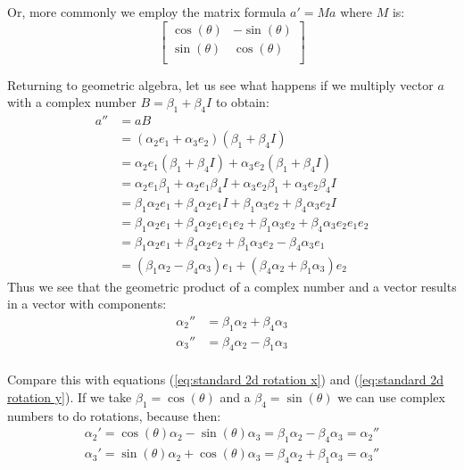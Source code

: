 \documentclass[10pt]{report}
\begin{document}
Or, more commonly we employ the matrix formula $a' = Ma$ where $M$
is:
\begin{equation*}
    \left[
    \begin{array}{rr}
    \cos(\theta)&-\sin(\theta)\\
    \sin(\theta)& \cos(\theta)\\
    \end{array}
    \right]
\end{equation*}

Returning to geometric algebra, let us see what happens if we
multiply vector $a$ with a complex number $B = \beta_1 + \beta_4I$
to obtain:
\begin{align*}
    a'' &= aB \\
        &= (\alpha_2e_1 + \alpha_3e_2)(\beta_1 + \beta_4I) \\
        &= \alpha_2e_1(\beta_1 + \beta_4I) + \alpha_3e_2(\beta_1 + \beta_4I) \\
        &= \alpha_2e_1\beta_1 + \alpha_2e_1\beta_4I + \alpha_3e_2\beta_1 + \alpha_3e_2\beta_4I  \\
        &= \beta_1\alpha_2e_1 + \beta_4\alpha_2e_1I + \beta_1\alpha_3e_2 + \beta_4\alpha_3e_2I  \\
        &= \beta_1\alpha_2e_1 + \beta_4\alpha_2e_1e_1e_2 + \beta_1\alpha_3e_2 + \beta_4\alpha_3e_2e_1e_2  \\
        &= \beta_1\alpha_2e_1 + \beta_4\alpha_2e_2 + \beta_1\alpha_3e_2 - \beta_4\alpha_3e_1  \\
        &= (\beta_1\alpha_2 - \beta_4\alpha_3)e_1 + (\beta_4\alpha_2 + \beta_1\alpha_3)e_2
\end{align*}
Thus we see that the geometric product of a complex number and a
vector results in a vector with components:
\begin{align}
    \alpha_2'' &= \beta_1\alpha_2 + \beta_4\alpha_3 \nonumber\\
    \alpha_3'' &= \beta_4\alpha_2 - \beta_1\alpha_3 \nonumber\\
\end{align}

Compare this with equations (\ref{eq:standard 2d rotation x}) and
(\ref{eq:standard 2d rotation y}). If we take $\beta_1 =
\cos(\theta)$ and a $\beta_4 = \sin(\theta)$ we can use complex
numbers to do rotations, because then:
\begin{align*}
    \alpha_2' = \cos(\theta)\alpha_2 - \sin(\theta)\alpha_3 = \beta_1\alpha_2 - \beta_4\alpha_3 = \alpha_2'' \\
    \alpha_3' = \sin(\theta)\alpha_2 + \cos(\theta)\alpha_3 = \beta_4\alpha_2 + \beta_1\alpha_3 = \alpha_3''
\end{align*}
\end{document}

